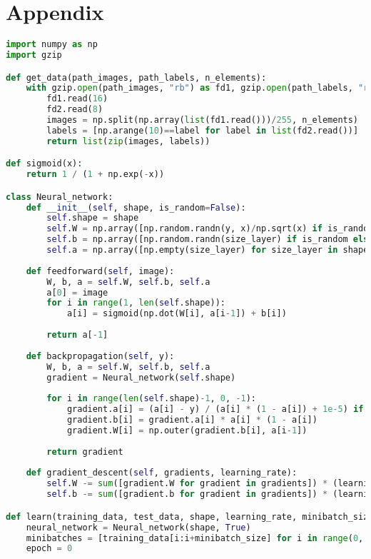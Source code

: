 \documentclass{article}
\theoremstyle{definition}
\theoremstyle{remark}
\theoremstyle{example}
\begin{document}
\section{Appendix}
\begin{lstlisting}[language=Python, basicstyle=\scriptsize]
import numpy as np
import gzip

def get_data(path_images, path_labels, n_elements):
	with gzip.open(path_images, "rb") as fd1, gzip.open(path_labels, "rb") as fd2:
		fd1.read(16)
		fd2.read(8)
		images = np.split(np.array(list(fd1.read()))/255, n_elements)
		labels = [np.arange(10)==label for label in list(fd2.read())]
		return list(zip(images, labels))

def sigmoid(x):
	return 1 / (1 + np.exp(-x))

class Neural_network:
	def __init__(self, shape, is_random=False):
		self.shape = shape
		self.W = np.array([np.random.randn(y, x)/np.sqrt(x) if is_random else np.empty([y, x]) for x, y in zip([0] + shape[:-1], [0] + shape[1:])], dtype=object)
		self.b = np.array([np.random.randn(size_layer) if is_random else np.empty(size_layer) for size_layer in [0] + shape[1:]], dtype=object)
		self.a = np.array([np.empty(size_layer) for size_layer in shape], dtype=object)
	
	def feedforward(self, image):
		W, b, a = self.W, self.b, self.a
		a[0] = image
		for i in range(1, len(self.shape)):
			a[i] = sigmoid(np.dot(W[i], a[i-1]) + b[i])
			
		return a[-1]
	
	def backpropagation(self, y):
		W, b, a = self.W, self.b, self.a
		gradient = Neural_network(self.shape)
		
		for i in range(len(self.shape)-1, 0, -1):
			gradient.a[i] = (a[i] - y) / (a[i] * (1 - a[i]) + 1e-5) if i==len(self.shape)-1 else np.dot(W[i+1].T, gradient.b[i+1])
			gradient.b[i] = gradient.a[i] * a[i] * (1 - a[i])
			gradient.W[i] = np.outer(gradient.b[i], a[i-1])
			
		return gradient
	
	def gradient_descent(self, gradients, learning_rate):
		self.W -= sum([gradient.W for gradient in gradients]) * (learning_rate/len(gradients))
		self.b -= sum([gradient.b for gradient in gradients]) * (learning_rate/len(gradients))

def learn(training_data, test_data, shape, learning_rate, minibatch_size):
	neural_network = Neural_network(shape, True)
	minibatches = [training_data[i:i+minibatch_size] for i in range(0, len(training_data), minibatch_size)]
	epoch = 0
	

\end{lstlisting}
\end{document}
